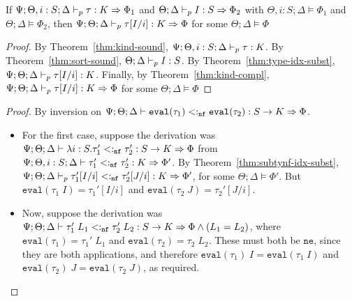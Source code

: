 \begin{theorem}
If $\Psi ; \Theta, i : S ; \Delta \vdash_p \tau : K \Rightarrow \Phi_1$ and $\Theta ; \Delta \vdash_p I : S \Rightarrow \Phi_2$ 
with $\Theta, i : S ; \Delta \vDash \Phi_1$ and $\Theta ; \Delta \vDash \Phi_2$, then
$\Psi ; \Theta ; \Delta \vdash_p \tau[I/i] : K \Rightarrow \Phi$ for some $\Theta ; \Delta \vDash \Phi$
\label{thm:type-idx-algo-subst}
\end{theorem}
\begin{proof}
By Theorem~\ref{thm:kind-sound}, $\Psi ; \Theta, i : S ; \Delta \vdash_p \tau : K$.
By Theorem~\ref{thm:sort-sound}, $\Theta ; \Delta \vdash_p I : S$.
By Theorem~\ref{thm:type-idx-subst}, $\Psi ; \Theta ; \Delta \vdash_p \tau[I/i] : K$.
Finally, by Theorem~\ref{thm:kind-compl}, $\Psi ; \Theta ; \Delta \vdash_p \tau[I/i] : K \Rightarrow \Phi$ for some $\Theta ; \Delta \vDash \Phi$
\end{proof}

\subtynfidxsubst*


\evalapplemma*
\begin{proof}
By inversion on $\Psi ; \Theta ; \Delta \vdash \texttt{eval}(\tau_1) <:_{\texttt{nf}} \texttt{eval}(\tau_2) : S \to K \Rightarrow \Phi$.
\begin{itemize}
  \item For the first case, suppose the derivation was $\Psi ; \Theta ; \Delta \vdash \lambda i : S. \tau_1' <:_{\texttt{nf}} \tau_2' : S \to K \Rightarrow \Phi$
  from $\Psi ; \Theta, i : S ; \Delta \vdash \tau_1' <:_{\texttt{nf}} \tau_2' : K \Rightarrow \Phi'$. By Theorem~\ref{thm:subtynf-idx-subst},
  $\Psi ; \Theta ; \Delta \vdash_p \tau_1'[I/i] <:_{\texttt{nf}} \tau_2'[J/i] : K \Rightarrow \Phi'$, for some $\Theta ; \Delta \vDash \Phi'$. But $\texttt{eval}(\tau_1 \; I) = \tau_1'[I/i]$ and $\texttt{eval}(\tau_2 \; J) = \tau_2'[J/i]$.
  \item Now, suppose the derivation was $\Psi ; \Theta ; \Delta \vdash \tau_1' \; L_1 <:_{\texttt{nf}} \tau_2' \; L_2 : S \to K \Rightarrow \Phi \wedge (L_1 = L_2)$, where $\texttt{eval}(\tau_1) = \tau_1' \; L_1$ and $\texttt{eval}(\tau_2) = \tau_2 \; L_2$. These must both be $\texttt{ne}$, since they are both applications, and therefore
  $\texttt{eval}(\tau_1) \; I = \texttt{eval}(\tau_1 \; I)$ and $\texttt{eval}(\tau_2) \; J = \texttt{eval}(\tau_2 \; J)$, as required.
\end{itemize}
\end{proof}

\subtycompl*


\admitsweaken*


\tycheckcompl*
